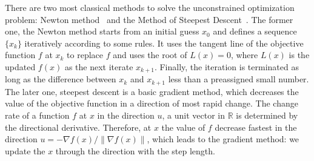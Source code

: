 \par There are two most classical methods to solve the unconstrained optimization problem: Newton method~\citep{NT:36} and the Method of Steepest Descent~\citep{DP:09}. The former one, the Newton method starts from an initial guess $x_0$ and defines a sequence $\{x_k\}$
iteratively according to some rules. It uses the tangent line of the objective function $f$ at $x_k$ to replace $f$ and uses the root of $L(x) = 0$, where $L(x)$ is the updated $f(x)$ as the next iterate $x_{k+1}$. Finally, the iteration is terminated as long as the difference between $x_k$ and $x_{k+1}$ less than a preassigned small number. The later one, steepest descent is a basic gradient method, which decreases the value of the objective function in a direction of most rapid change. The change rate of a function $f$ at $x$ in the direction $u$, a unit vector in $\mathbb{R}$ is determined by the directional derivative. Therefore, at $x$ the value of $f$ decrease fastest in the direction $u=-\nabla f(x)/\|\nabla f(x)\|$, which leads to the gradient method: we update the $x$ through the direction with the step length. 



